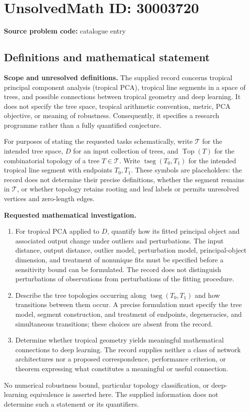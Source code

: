 \documentclass[11pt]{article}
\begin{document}
\section*{UnsolvedMath ID: 30003720}
\textbf{Source problem code:} catalogue entry
\subsection{Definitions and mathematical statement}
\textbf{Scope and unresolved definitions.} The supplied record concerns tropical principal component analysis (tropical PCA), tropical line segments in a space of trees, and possible connections between tropical geometry and deep learning. It does not specify the tree space, tropical arithmetic convention, metric, PCA objective, or meaning of robustness. Consequently, it specifies a research programme rather than a fully quantified conjecture.

For purposes of stating the requested tasks schematically, write \(\mathcal T\) for the intended tree space, \(D\) for an input collection of trees, and \(\operatorname{Top}(T)\) for the combinatorial topology of a tree \(T\in\mathcal T\). Write \(\operatorname{tseg}(T_0,T_1)\) for the intended tropical line segment with endpoints \(T_0,T_1\). These symbols are placeholders: the record does not determine their precise definitions, whether the segment remains in \(\mathcal T\), or whether topology retains rooting and leaf labels or permits unresolved vertices and zero-length edges.

\textbf{Requested mathematical investigation.}
\begin{enumerate}
\item For tropical PCA applied to \(D\), quantify how its fitted principal object and associated output change under outliers and perturbations. The input distance, output distance, outlier model, perturbation model, principal-object dimension, and treatment of nonunique fits must be specified before a sensitivity bound can be formulated. The record does not distinguish perturbations of observations from perturbations of the fitting procedure.
\item Describe the tree topologies occurring along \(\operatorname{tseg}(T_0,T_1)\) and how transitions between them occur. A precise formulation must specify the tree model, segment construction, and treatment of endpoints, degeneracies, and simultaneous transitions; these choices are absent from the record.
\item Determine whether tropical geometry yields meaningful mathematical connections to deep learning. The record supplies neither a class of network architectures nor a proposed correspondence, performance criterion, or theorem expressing what constitutes a meaningful or useful connection.
\end{enumerate}
No numerical robustness bound, particular topology classification, or deep-learning equivalence is asserted here. The supplied information does not determine such a statement or its quantifiers.
\end{document}

